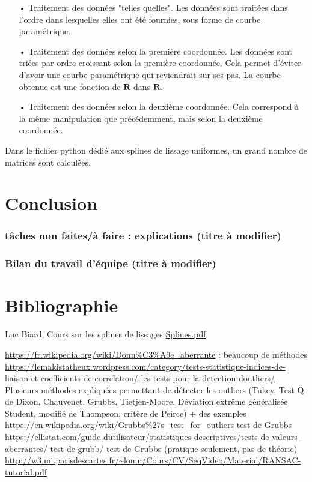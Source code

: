 \documentclass[a4paper,12pt]{article} %
\begin{document}
\begin{itemize}
    \item[•] Traitement des données "telles quelles". Les données sont traitées dans l'ordre dans lesquelles elles ont été fournies, sous forme de courbe paramétrique.
    \item[•] Traitement des données selon la première coordonnée. Les données sont triées par ordre croissant selon la première coordonnée. Cela permet d'éviter d'avoir une courbe paramétrique qui reviendrait sur ses pas. La courbe obtenue est une fonction de $\mathbf{R}$ dans $\mathbf{R}$.
    \item[•] Traitement des données selon la deuxième coordonnée. Cela correspond à la même manipulation que précédemment, mais selon la deuxième coordonnée.
\end{itemize}
Dans le fichier python dédié aux splines de lissage uniformes, un grand nombre de matrices sont calculées.

\renewcommand\partname{}
\part{Conclusion}
	\section{tâches non faites/à faire : explications (titre à modifier)}
	\section{Bilan du travail d'équipe (titre à modifier)}



\renewcommand\partname{}
\part{Bibliographie}

Luc Biard, Cours sur les splines de lissages
\href{http://www-ljk.imag.fr/membres/Luc.Biard/L3MI_cours/Splines.pdf}{Splines.pdf}


\url{https://fr.wikipedia.org/wiki/Donn\%C3\%A9e_aberrante} : beaucoup de méthodes \\
\url{https://lemakistatheux.wordpress.com/category/tests-statistique-indices-de-liaison-et-coefficients-de-correlation/ les-tests-pour-la-detection-doutliers/} Plusieurs méthodes expliquées permettant de détecter les outliers (Tukey, Test Q de Dixon, Chauvenet, Grubbs, Tietjen-Moore, Déviation extrême généralisée Student, modiﬁé de Thompson, critère de Peirce) + des exemples \\
\url{ https://en.wikipedia.org/wiki/Grubbs\%27s_test_for_outliers} test de Grubbs \\
\url{https://ellistat.com/guide-dutilisateur/statistiques-descriptives/tests-de-valeurs-aberrantes/ test-de-grubb/} test de Grubbs (pratique seulement, pas de théorie)\\
\url{http://w3.mi.parisdescartes.fr/~lomn/Cours/CV/SeqVideo/Material/RANSAC-tutorial.pdf}\\
\end{document}
